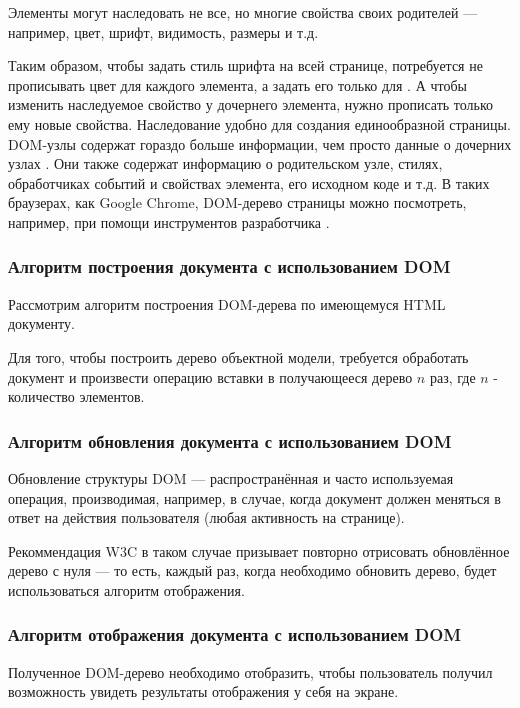 \clearpage

Элементы могут наследовать не все, но многие свойства своих родителей --- например, цвет, шрифт, видимость, размеры и т.д.

Таким образом, чтобы задать стиль шрифта на всей странице, потребуется не прописывать цвет для каждого элемента, а задать его только для . 
А чтобы изменить наследуемое свойство у дочернего элемента, нужно прописать только ему новые свойства. 
Наследование удобно для создания единообразной страницы.
DOM-узлы содержат гораздо больше информации, чем просто данные о дочерних узлах \cite{dom-element}.
Они также содержат информацию о родительском узле, стилях, обработчиках событий и свойствах элемента, его исходном  коде и т.д.
В таких браузерах, как Google Chrome, DOM-дерево страницы можно посмотреть, например, при помощи инструментов разработчика \cite{devtools}.

\subsubsection{Алгоритм построения документа с использованием  DOM}

Рассмотрим алгоритм построения DOM-дерева по имеющемуся HTML документу.

Для того, чтобы построить дерево объектной модели, требуется обработать документ и произвести операцию вставки в получающееся дерево $n$ раз, где $n$ - количество элементов.

\subsubsection{Алгоритм обновления документа с использованием DOM}

Обновление структуры DOM --- распространённая и часто используемая операция, производимая, например, в случае, когда документ должен меняться в ответ на действия пользователя (любая активность на странице).

Рекоммендация W3C в таком случае призывает повторно отрисовать обновлённое дерево с нуля --- то есть, каждый раз, когда необходимо обновить дерево, будет использоваться алгоритм отображения.


\subsubsection{Алгоритм отображения документа с использованием DOM}

Полученное DOM-дерево необходимо отобразить, чтобы пользователь получил возможность увидеть результаты отображения у себя на экране.

